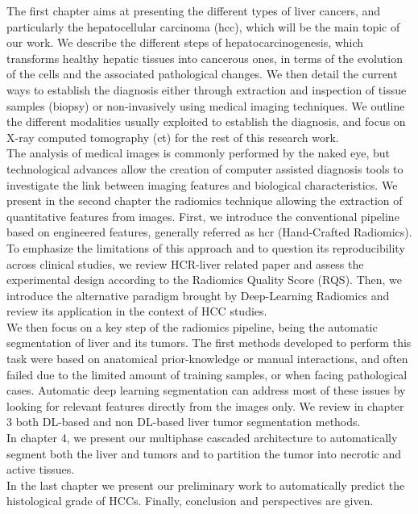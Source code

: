 The first chapter aims at presenting the different types of liver cancers, and particularly the
hepatocellular carcinoma (\ac{hcc}), which will be the main topic of our work. We describe the different steps of hepatocarcinogenesis, which
transforms healthy hepatic tissues into cancerous ones, in terms of the
evolution of the cells and the associated pathological changes. 
We then detail the current ways to establish the diagnosis either through extraction and inspection of tissue samples (biopsy) or 
non-invasively using medical imaging techniques.  We outline the different modalities usually exploited to establish the diagnosis, and focus on X-ray computed tomography (\ac{ct}) for the rest of this
research work. \\
The analysis of medical images is commonly performed by the naked eye,
but technological advances allow the creation of computer assisted
diagnosis tools to investigate the link between imaging features 
and biological characteristics.
We present in the second chapter the radiomics technique allowing the extraction of quantitative features from images. First, we introduce the conventional pipeline based on engineered features, generally referred as \ac{hcr} (Hand-Crafted Radiomics). To emphasize the limitations of this approach and to question its reproducibility across clinical studies, we review HCR-liver related paper and assess the experimental design according to the Radiomics Quality Score (RQS). Then, we introduce the alternative paradigm brought by Deep-Learning Radiomics and review its application in the context of HCC studies.\\
We then focus on a key step of the radiomics pipeline, being the automatic segmentation of liver and its tumors.
The first methods developed to perform this task were based on
anatomical prior-knowledge or manual interactions, and often failed due to  the limited amount of training samples, or when
facing pathological cases. Automatic deep learning segmentation can address most of these issues by looking for relevant features directly from the images only. We review in chapter 3 both DL-based and non DL-based liver tumor segmentation methods.\\
In chapter 4, we present our multiphase cascaded architecture to automatically segment both the liver and tumors and to partition the tumor into necrotic and active tissues.\\
In the last chapter we present our preliminary work to automatically predict the histological grade of HCCs.
Finally, conclusion and perspectives are given.

